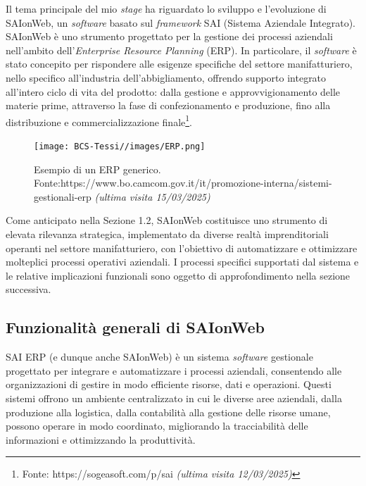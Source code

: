     Il tema principale del mio \textit{stage} ha riguardato lo sviluppo e l'evoluzione di SAIonWeb, un \textit{software} basato sul \textit{framework} SAI (Sistema Aziendale Integrato). SAIonWeb è uno strumento progettato per la gestione dei processi aziendali nell'ambito dell'\textit{Enterprise Resource Planning} (ERP). In particolare, il \textit{software} è stato concepito per rispondere alle esigenze specifiche del settore manifatturiero, nello specifico all'industria dell'abbigliamento, offrendo supporto integrato all'intero ciclo di vita del prodotto: dalla gestione e approvvigionamento delle materie prime, attraverso la fase di confezionamento e produzione, fino alla distribuzione e commercializzazione finale\footnote{Fonte: https://sogeasoft.com/p/sai \textit{(ultima visita 12/03/2025)}}. 

    \begin{figure}[H]
        \centering
        \texttt{[image: BCS-Tessi//images/ERP.png]}
        \caption[Esempio di un ERP generico]{Esempio di un ERP generico. Fonte:https://www.bo.camcom.gov.it/it/promozione-interna/sistemi-gestionali-erp \textit{(ultima visita 15/03/2025)}}
        \label{fig:ERP}
    \end{figure}

    \vspace{0.2 em}
    \noindent Come anticipato nella Sezione 1.2, SAIonWeb costituisce uno strumento di elevata rilevanza strategica, implementato da diverse realtà imprenditoriali operanti nel settore manifatturiero, con l'obiettivo di automatizzare e ottimizzare molteplici processi operativi aziendali. I processi specifici supportati dal sistema e le relative implicazioni funzionali sono oggetto di approfondimento nella sezione successiva.
    
        \subsection{Funzionalità generali di SAIonWeb}
        SAI ERP (e dunque anche SAIonWeb) è un sistema \textit{software} gestionale progettato per integrare e automatizzare i processi aziendali, consentendo alle organizzazioni di gestire in modo efficiente risorse, dati e operazioni. Questi sistemi offrono un ambiente centralizzato in cui le diverse aree aziendali, dalla produzione alla logistica, dalla contabilità alla gestione delle risorse umane, possono operare in modo coordinato, migliorando la tracciabilità delle informazioni e ottimizzando la produttività.  


